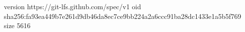 version https://git-lfs.github.com/spec/v1
oid sha256:fa93ea449b7e261d9db46da8ec7ce9bb224a2a6ccc91ba28dc1433e1a5b5f769
size 5616
